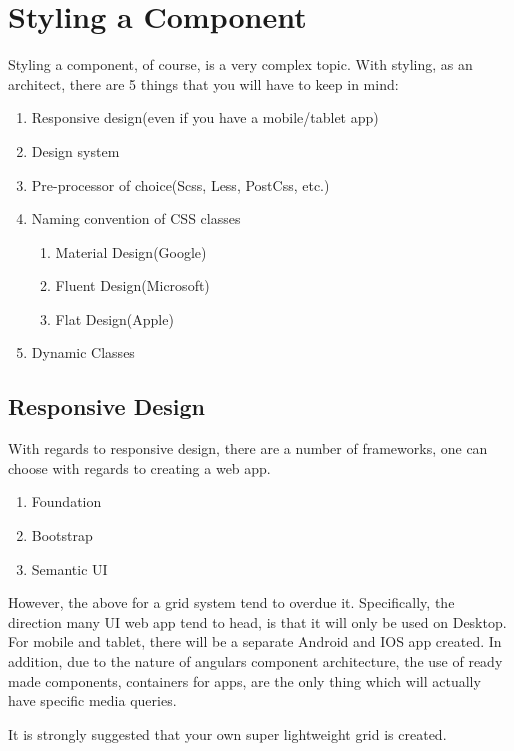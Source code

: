 \maketitle{}
\section{ Styling a Component }

Styling a component, of course, is a very complex topic. With styling, as an
architect, there are 5 things that you will have to keep in mind:
\begin{enumerate}
  \item Responsive design(even if you have a mobile/tablet app)
  \item Design system
  \item Pre-processor of choice(Scss, Less, PostCss, etc.)
  \item Naming convention of CSS classes
    \begin{enumerate}
      \item Material Design(Google)
      \item Fluent Design(Microsoft)
      \item Flat Design(Apple)
    \end{enumerate}
  \item Dynamic Classes
\end{enumerate}

\subsection{ Responsive Design }
With regards to responsive design, there are a number of frameworks, one can
choose with regards to creating a web app.
\begin{enumerate}
  \item Foundation
  \item Bootstrap
  \item Semantic UI
\end{enumerate}

However, the above for a grid system tend to overdue it. Specifically, the
direction many UI web app tend to head, is that it will only be used on Desktop.
For mobile and tablet, there will be a separate Android and IOS app created.
In addition, due to the nature of angulars component architecture, the use of
ready made components, containers for apps, are the only thing which will
actually have specific media queries.

It is strongly suggested that your own super lightweight grid is created. 
